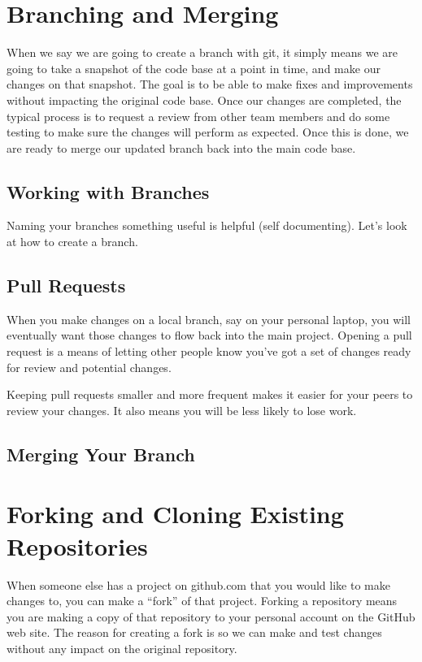 \section{Branching and Merging}

When we say we are going to create a branch with git, it simply means we are going to take a snapshot of the code base at a point in time, and make our changes on that snapshot. The goal is to be able to make fixes and improvements without impacting the original code base.
Once our changes are completed, the typical process is to request a review from other team members and do some testing to make sure the changes will perform as expected. Once this is done, we are ready to merge our updated branch back into the main code base.

\subsection{Working with Branches}

\justifying
Naming your branches something useful is helpful (self documenting). Let's look at how to create a branch.

\subsection{Pull Requests}

\justifying
When you make changes on a local branch, say on your personal laptop, you will eventually want those changes
to flow back into the main project. Opening a pull request is a means of letting other
people know you've got a set of changes ready for review and potential changes.

\justifying
Keeping pull requests smaller and more frequent makes it easier for your
peers to review your changes. It also means you will be less likely to lose work.

\subsection{Merging Your Branch}


\section{Forking and Cloning Existing Repositories}

\justifying
When someone else has a project on github.com that you would like to make changes to, you can make a ``fork'' of that project.
Forking a repository means you are making a copy of that repository to your personal account on the GitHub web
site. The reason for creating a fork is so we can make and test changes without any impact on the original repository.

